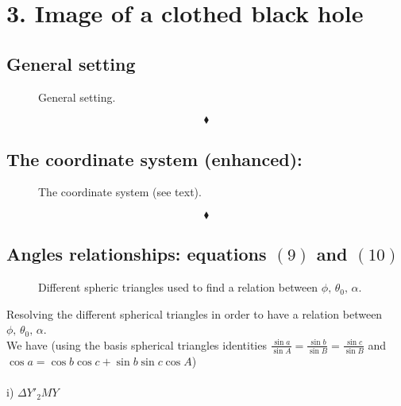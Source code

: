 \chapter{3. Image of a clothed black hole}
\pagebreak[4]

\section{General setting}
\begin{figure}[H]
 \centering

\caption{General setting.}
\label{fig:fig_4}
\end{figure}
$$\blacklozenge$$\newpage
\section{The coordinate system (enhanced):}

\begin{figure}[H]
 \centering

\caption{The coordinate system (see text).}
\label{fig:fig_3}
\end{figure}
$$\blacklozenge$$\newpage



\section{Angles relationships: equations $(9)$ and $(10)$}

\begin{figure}[H]
 \centering

\caption{Different spheric triangles used to find a relation between $\phi,\, \theta_0,\, \alpha$.}
\label{fig:fig_5}
\end{figure}
Resolving the different spherical triangles in order to have a relation between $\phi,\, \theta_0,\, \alpha$.\\
We have (using the basis spherical triangles identities $\frac{\sin{a}}{\sin{A}}= \frac{\sin{b}}{\sin{B}}=\frac{\sin{c}}{\sin{B}}$ and $\cos{a}=\cos{b}\cos{c}+\sin{b}\sin{c}\cos{A}$)\\\\
i) $\Delta Y'_2MY$

